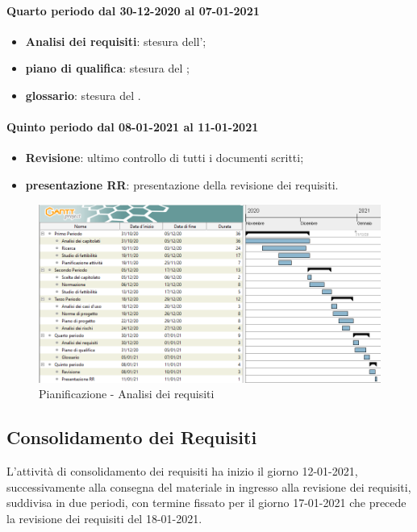 \paragraph{Quarto periodo dal 30-12-2020 al 07-01-2021}
\begin{itemize}
	\item \textbf{Analisi dei requisiti}: stesura dell’;
	\item \textbf{piano di qualifica}: stesura del ;
	\item \textbf{glossario}: stesura del .
\end{itemize}

\paragraph{Quinto periodo dal 08-01-2021 al 11-01-2021}
\begin{itemize}
	\item \textbf{Revisione}: ultimo controllo di tutti i documenti scritti;
	\item \textbf{presentazione RR}: presentazione della revisione dei requisiti.
\end{itemize}


\newpage

\begin{landscape}
	\begin{figure}[h!]
		\includegraphics[width=24cm]{images/1_Analisi_dei_requisiti.png}
		\caption{Pianificazione - Analisi dei requisiti}
	\end{figure}
\end{landscape}

\newpage

\subsection{Consolidamento dei Requisiti}
L'attività di consolidamento dei requisiti ha inizio il giorno 12-01-2021, successivamente alla consegna del materiale in ingresso alla revisione dei requisiti, suddivisa in due periodi, con termine fissato
per il giorno 17-01-2021 che precede la revisione dei requisiti del 18-01-2021.

